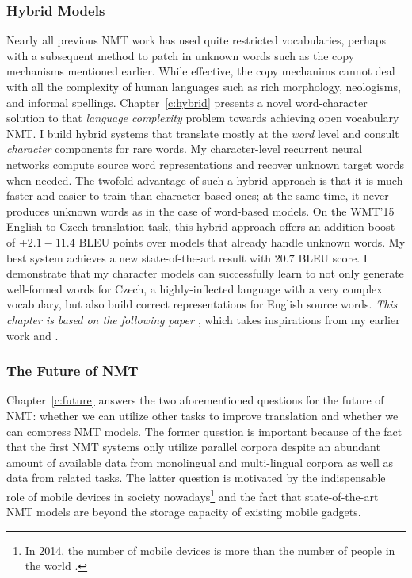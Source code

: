 \subsubsection{Hybrid Models} 
Nearly all previous NMT work has used quite restricted
vocabularies, perhaps with a subsequent method to patch in unknown words such as
the copy mechanisms mentioned earlier. While effective, the copy mechanims cannot deal with all the
complexity of human languages such as rich morphology, neologisms, and informal
spellings.
Chapter~\ref{c:hybrid} presents a novel word-character solution to that {\it
language complexity} problem towards achieving
open vocabulary NMT.
I build hybrid systems that translate mostly at the {\it word}
level and consult {\it character} components for rare words. 
My character-level recurrent neural networks compute source
word representations and recover unknown target words when needed.
The twofold advantage of such a hybrid approach is that it is much faster and easier to
train than character-based ones; at the same time, it never produces unknown words as in the case of word-based models. 
On the WMT'15 English to Czech translation task, 
this hybrid approach offers an addition boost of +$2.1{-}11.4$ BLEU points over models 
that already handle unknown words. 
My best system achieves a new state-of-the-art result with
$20.7$ BLEU score.
I demonstrate that my character models can successfully learn to not only generate well-formed words for Czech, a
highly-inflected language with a very complex vocabulary, but also build correct
representations for English source words.
{\it This chapter is based on the following paper \cite{luong16}}, which takes inspirations from my earlier work \cite{luong13} and \cite{li15}.

\subsubsection{The Future of NMT} 
Chapter~\ref{c:future} answers the two aforementioned questions
for the future of NMT: whether we can utilize other tasks to improve
translation and whether we can compress NMT models. 
The former question is important because of the fact that the first NMT systems only
utilize parallel corpora despite an abundant amount of available data from
monolingual and multi-lingual corpora as well as data from related tasks. The
latter question is motivated by the indispensable role of mobile devices in 
society nowadays\footnote{In 2014, the number of mobile devices is more than the number
of people in the world \cite{mobiledevices}.} 
and the fact that state-of-the-art NMT models are beyond the storage capacity of
existing mobile gadgets.

